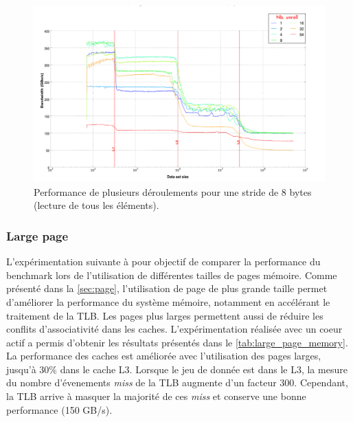     \begin{figure}
    \center
    \includegraphics[width=16cm]{images/dml_unroll_best.png}
    \caption{\label{pic:dml_unroll_best} Performance de plusieurs déroulements pour une stride de 8 bytes (lecture de tous les éléments).}
    \end{figure}
    
    
    \subsubsection{Large page} \label{sec:dml_large_page}

    L'expérimentation suivante à pour objectif de comparer la performance du benchmark lors de l'utilisation de différentes tailles de pages mémoire. Comme présenté dans la \autoref{sec:page}, l'utilisation de page de plus grande taille permet d'améliorer la performance du système mémoire, notamment en accélérant le traitement de la TLB. Les pages plus larges permettent aussi de réduire les conflits d'associativité dans les caches. L'expérimentation réalisée avec un coeur actif a permis d'obtenir les résultats présentés dans le \autoref{tab:large_page_memory}. La performance des caches est améliorée avec l'utilisation des pages larges, jusqu'à 30\% dans le cache L3. Lorsque le jeu de donnée est dans le L3, la mesure du nombre d'évenements \textit{miss} de la TLB augmente d'un facteur 300. Cependant, la TLB arrive à masquer la majorité de ces \textit{miss} et conserve une bonne performance (150 GB/s).

